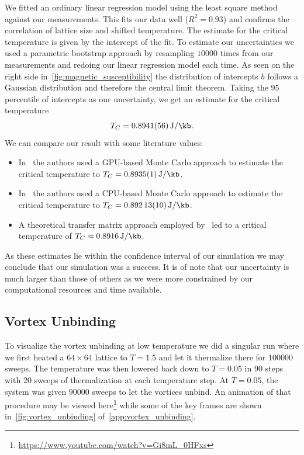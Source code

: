 We fitted an ordinary linear regression model using the least square method against our measurements. This fits our data well ($R^2 = \num{0.93}$) and confirms the correlation of lattice size and shifted temperature. The estimate for the critical temperature is given by the intercept of the fit. To estimate our uncertainties we used a parametric bootstrap approach by resampling $\num{10 000}$ times from our measurements and redoing our linear regression model each time. As seen on the right side in~\cref{fig:magnetic_susceptibility} the distribution of intercepts $b$ follows a Gaussian distribution and therefore the central limit theorem. Taking the $\num{95}$ percentile of intercepts as our uncertainty, we get an estimate for the critical temperature
\begin{equation}
	T_C = \SI{0.8941(56)}{\J\per\kb}.
\end{equation}
We can compare our result with some literature values:
\begin{itemize}
	\item In~\citet{literature_gpu} the authors used a GPU-based Monte Carlo approach to estimate the critical temperature to $T_C=\SI{0.8935(1)}{\J\per\kb}$.
	\item In~\citet{literature_cpu} the authors used a CPU-based Monte Carlo approach to estimate the critical temperature to $T_C=\SI{0.89213(10)}{\J\per\kb}$.
	\item A theoretical transfer matrix approach employed by~\cite{literature_theo} led to a critical temperature of $T_C \approx \SI{0.8916}{\J\per\kb}$.
\end{itemize}
As these estimates lie within the confidence interval of our simulation we may conclude that our simulation was a success. It is of note that our uncertainty is much larger than those of others as we were more constrained by our computational resources and time available.

\subsection{Vortex Unbinding}\label{sec:vortex_unbinding}
To visualize the vortex unbinding at low temperature we did a singular run where we first heated a $64 \times 64$ lattice  to $T = \num{1.5}$ and let it thermalize there for $\num{100 000}$ sweeps. The temperature was then lowered back down to $T = \num{0.05}$ in $90$ steps with $20$ sweeps of thermalization at each temperature step. At $T = \num{0.05}$, the system was given $\num{90 000}$ sweeps to let the vortices unbind. An animation of that procedure may be viewed here\footnote{\url{https://www.youtube.com/watch?v=Gi8mL_0HFxs}} while some of the key frames are shown in~\cref{fig:vortex_unbinding} of~\cref{app:vortex_unbinding}.

